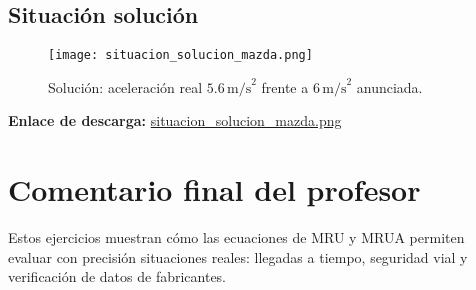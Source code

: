 \documentclass[12pt,a4paper,openany]{book} %
\begin{document}
\section{Situación solución}
\begin{figure}[h!]
  \centering
  \texttt{[image: situacion\_solucion\_mazda.png]}
  \caption{Solución: aceleración real \(5.6\,\text{m/s}^2\) frente a \(6\,\text{m/s}^2\) anunciada.}
\end{figure}
\noindent\textbf{Enlace de descarga:} \href{run:imagenes/situacion_solucion_mazda.png}{situacion\_solucion\_mazda.png}

\chapter*{Comentario final del profesor}
Estos ejercicios muestran cómo las ecuaciones de MRU y MRUA permiten evaluar con precisión situaciones reales:  
llegadas a tiempo, seguridad vial y verificación de datos de fabricantes.
\end{document}
